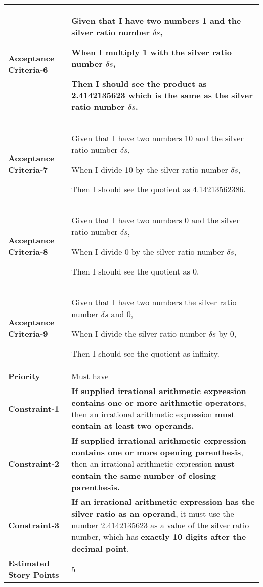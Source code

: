 \begin{center}
\begin{tabular}{ | m{2.3cm} | m{12cm} | }
\hline
\textbf{Acceptance Criteria-6} & Given that I have two numbers 1 and the silver ratio number $\delta s$,

When I multiply 1 with the silver ratio number $\delta s$,

Then I should see the product as 2.4142135623 which is the same as the silver ratio number $\delta s$. \\

\hline
\textbf{Acceptance Criteria-7} & Given that I have two numbers 10 and the silver ratio number $\delta s$,

When I divide 10 by the silver ratio number $\delta s$,

Then I should see the quotient as 4.14213562386. \\

\hline
\textbf{Acceptance Criteria-8} & Given that I have two numbers 0 and the silver ratio number $\delta s$,

When I divide 0 by the silver ratio number $\delta s$,

Then I should see the quotient as 0. \\

\hline
\textbf{Acceptance Criteria-9} & Given that I have two numbers the silver ratio number $\delta s$ and 0,

When I divide the silver ratio number $\delta s$ by 0,

Then I should see the quotient as infinity.\\

\hline
\textbf{Priority} & Must have \\ 

\hline
\textbf{Constraint-1} & \textbf{If supplied irrational arithmetic expression contains one or more arithmetic operators}, then an irrational arithmetic expression \textbf{must contain at least two operands.}\\

\hline
\textbf{Constraint-2} & \textbf{If supplied irrational arithmetic expression contains one or more opening parenthesis}, then an irrational arithmetic expression \textbf{must contain the same number of closing parenthesis.}\\

\hline
\textbf{Constraint-3} & \textbf{If an irrational arithmetic expression has the silver ratio as an operand}, it must use the number 2.4142135623 as a value of the silver ratio number, which has \textbf{exactly 10 digits after the decimal point}.\\

\hline
\textbf{Estimated Story Points} & 5 \\ 
\hline

\end{tabular}
\end{center}

